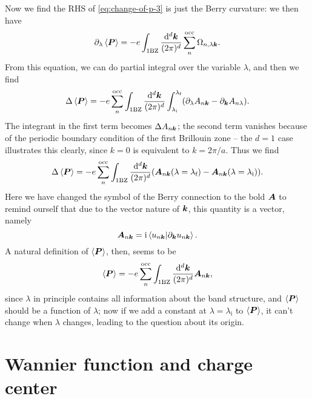 \documentclass[hyperref, a4paper]{article}
\newcommand*{\ii}{\mathrm{i}}
\begin{document}
Now we find the RHS of \eqref{eq:change-of-p-3} is just the Berry curvature:
we then have 
\begin{equation}
    \partial_\lambda \expval{\vb*{P}}
    = - e \int_{\text{1BZ}} \frac{\dd[d]{\vb*{k}}}{(2\pi)^d} \sum_{n}^{\text{occ}} \Omega_{n, \lambda \vb*{k}}.
\end{equation}
From this equation, 
we can do partial integral over the variable $\lambda$, 
and then we find 
\begin{equation}
    \Delta \expval{\vb*{P}}
    = - e \sum_{n}^{\text{occ}}
    \int_{\text{1BZ}} \frac{\dd[d]{\vb*{k}}}{(2\pi)^d} \int_{\lambda_{\text{i}}}^{\lambda_{\text{f}}}    
    (\partial_\lambda A_{n \vb*{k}} - \partial_{\vb*{k}} A_{n \lambda}).
\end{equation}
The integrant in the first term becomes $\Delta A_{n \vb*{k}}$;
the second term vanishes because of the periodic boundary condition 
of the first Brillouin zone -- 
the $d = 1$ case illustrates this clearly, 
since $k = 0$ is equivalent to $k = 2 \pi / a$.
Thus we find 
\begin{equation}
    \Delta \expval{\vb*{P}}
    = - e \sum_{n}^{\text{occ}} \int_{\text{1BZ}} \frac{\dd[d]{\vb*{k}}}{(2\pi)^d} (
        \vb*{A}_{n \vb*{k}}(\lambda = \lambda_{\text{f}})
        - \vb*{A}_{n \vb*{k}}(\lambda = \lambda_{\text{i}})).
\end{equation}
Here we have changed the symbol of the Berry connection to the bold $\vb*{A}$ 
to remind ourself that due to the vector nature of $\vb*{k}$,
this quantity is a vector, namely 
\begin{equation}
    \vb*{A}_{n \vb*{k}} = \ii \braket*{u_{n \vb*{k}}}{\partial_{\vb*{k}} u_{n \vb*{k}}} .
\end{equation}
A natural definition of $\expval{\vb*{P}}$, then, seems to be 
\begin{equation}
    \expval{\vb*{P}} = - e \sum_{n}^{\text{occ}} \int_{\text{1BZ}} \frac{\dd[d]{\vb*{k}}}{(2\pi)^d} 
        \vb*{A}_{n \vb*{k}},
    \label{eq:polarization-good-def-1}
\end{equation}
since $\lambda$ in principle contains all information about 
the band structure, 
and $\expval{\vb*{P}}$ should be a function of $\lambda$;
now if we add a constant at $\lambda = \lambda_{\text{i}}$ to $\expval{\vb*{P}}$,
it can't change when $\lambda$ changes, 
leading to the question about its origin.

\section{Wannier function and charge center}
\end{document}
